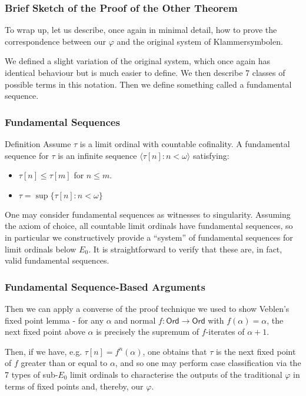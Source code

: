 \documentclass{beamer}
\begin{document}
\begin{frame}
\frametitle{Brief Sketch of the Proof of the Other Theorem}
To wrap up, let us describe, once again in minimal detail, how to prove the correspondence between our $\varphi$ and the original system of Klammersymbolen. \pause

We defined a slight variation of the original system, which once again has identical behaviour but is much easier to define. We then describe 7 classes of possible terms in this notation. Then we define something called a fundamental sequence.
\end{frame}

\begin{frame}
\frametitle{Fundamental Sequences}
\begin{block}{Definition}
Assume $\tau$ is a limit ordinal with countable cofinality. A fundamental sequence for $\tau$ is an infinite sequence $\langle \tau[n]: n < \omega \rangle$ satisfying:

\begin{itemize}
    \item $\tau[n] \leq \tau[m]$ for $n \leq m$.
    \item $\tau = \sup\{\tau[n]: n < \omega\}$
\end{itemize}
\end{block}

One may consider fundamental sequences as witnesses to singularity. Assuming the axiom of choice, all countable limit ordinals have fundamental sequences, so in particular we constructively provide a ``system'' of fundamental sequences for limit ordinals below $E_0$. \pause It is straightforward to verify that these are, in fact, valid fundamental sequences.
\end{frame}

\begin{frame}
\frametitle{Fundamental Sequence-Based Arguments}
Then we can apply a converse of the proof technique we used to show Veblen's fixed point lemma - for any $\alpha$ and normal $f: \mathsf{Ord} \to \mathsf{Ord}$ with $f(\alpha) = \alpha$, the next fixed point above $\alpha$ is precisely the supremum of $f$-iterates of $\alpha+1$.

Then, if we have, e.g. $\tau[n] = f^n(\alpha)$, one obtains that $\tau$ is the next fixed point of $f$ greater than or equal to $\alpha$, and so one may perform case classification via the 7 types of sub-$E_0$ limit ordinals to characterise the outputs of the traditional $\varphi$ in terms of fixed points and, thereby, our $\varphi$.
\end{frame}
\end{document}
